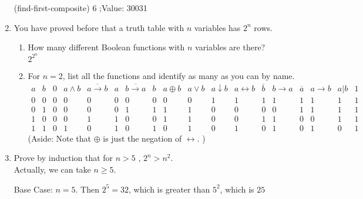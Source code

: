 \documentclass[12pt]{amsart}
\newcommand{\ov}[1]{\overline{#1}}
\newcommand{\ra}{\rightarrow}
\newcommand{\lra}{\leftrightarrow}
\begin{document}
\begin{enumerate}
\vskip 10pt

\beginlisp
(find-first-composite)
6
;Value: 30031
\endlisp

\vskip 10pt

    \item
    You have proved before that a truth table with $n$ variables
    has $2^{n}$ rows.
    \begin{enumerate}
    \item
    How many different Boolean functions with $n$ variables are
    there? \\
    $2^{2^n}$
    \item For $n = 2$, list all the functions and identify as many as
    you can by name. \\
\[
    \begin{array}{c|c|c|c|c|c|c|c|c|c|c|c|c|c|c|c|c|c}
        a   &   b   &   0   &a \wedge b&\ov{a\ra b} &   a   &\ov{b\ra a} &   b  & a \oplus b &a \vee b &a\downarrow b& a \lra b& \ov{b}& b \ra a &\ov{a} & a\ra b&a \vert b&  1 \\\hline
        0   &   0   &   0   &   0      &   0          &   0   &   0         &   0  &   0   &   0   &   1      &   1    &   1   &    1    &   1   &   1   &   1   &  1 \\
        0   &   1   &   0   &   0      &   0          &   0   &   1         &   1  &   1   &   1   &   0      &   0    &   0   &    0    &   1   &   1   &   1   &  1 \\
        1   &   0   &   0   &   0      &   1          &   1   &   0         &   0  &   1   &   1   &   0      &   0    &   1   &    1    &   0   &   0   &   1   &  1 \\
        1   &   1   &   0   &   1      &   0          &   1   &   0         &   1  &   0   &   1   &   0      &   1    &   0   &    1    &   0   &   1   &   0   &  1
    \end{array}
    \]
    (Aside: Note that $\oplus$ is just the negation of $\lra$. )
    \end{enumerate}

\item
    Prove by induction that for $n > 5 $ , $2^{n} > n^{2}$. \\
    Actually, we can take $n \ge 5$.

    Base Case: $n = 5$. Then $2^5 = 32$, which is greater than
    $5^2$, which is $25$ \\


\end{enumerate}
\end{document}

